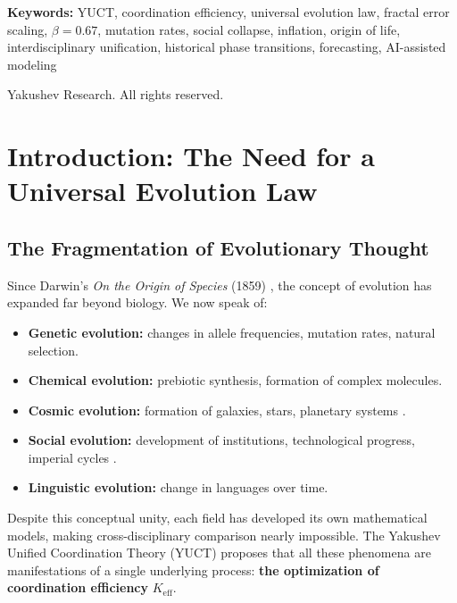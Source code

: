 \documentclass[12pt,a4paper]{article}
\theoremstyle{remark}
\newcommand{\Keff}{K_{\mathrm{eff}}}
\begin{document}
\begin{titlepage}
\begin{center}
			\vspace{1cm}
			
			\noindent
			\small\textbf{Keywords:} YUCT, coordination efficiency, universal evolution law, fractal error scaling, $\beta=0.67$, mutation rates, social collapse, inflation, origin of life, interdisciplinary unification, historical phase transitions, forecasting, AI-assisted modeling
			
			\vspace{0.5cm}
			
			\noindent
			 Yakushev Research. All rights reserved.
		\end{center}
	\end{titlepage}
	
	\tableofcontents
	\newpage
	
	\section{Introduction: The Need for a Universal Evolution Law}
	
	\subsection{The Fragmentation of Evolutionary Thought}
	
	Since Darwin's \textit{On the Origin of Species} (1859) \cite{Darwin1859}, the concept of evolution has expanded far beyond biology. We now speak of:
	
	\begin{itemize}
		\item \textbf{Genetic evolution:} changes in allele frequencies, mutation rates, natural selection.
		\item \textbf{Chemical evolution:} prebiotic synthesis, formation of complex molecules.
		\item \textbf{Cosmic evolution:} formation of galaxies, stars, planetary systems \cite{Chaisson2001}.
		\item \textbf{Social evolution:} development of institutions, technological progress, imperial cycles \cite{Boulding1978}.
		\item \textbf{Linguistic evolution:} change in languages over time.
	\end{itemize}
	
	Despite this conceptual unity, each field has developed its own mathematical models, making cross-disciplinary comparison nearly impossible. The Yakushev Unified Coordination Theory (YUCT) proposes that all these phenomena are manifestations of a single underlying process: \textbf{the optimization of coordination efficiency} $\Keff$.
	
\end{document}
